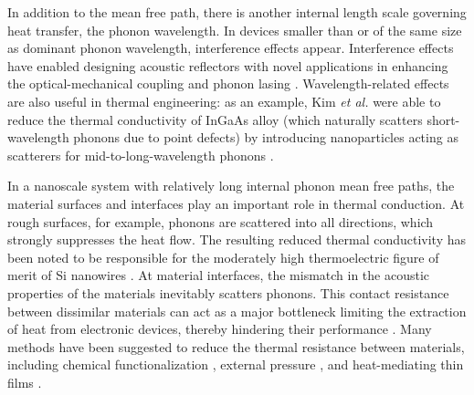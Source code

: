 In addition to the mean free path, there is another internal length scale governing heat transfer, the phonon wavelength. In devices smaller than or of the same size as dominant phonon wavelength, interference effects appear. Interference effects have enabled designing acoustic reflectors with novel applications in enhancing the optical-mechanical coupling \cite{fainstein13} and phonon lasing \cite{maryam13}. Wavelength-related effects are also useful in thermal engineering: as an example, Kim \textit{et al.} were able to reduce the thermal conductivity of InGaAs alloy (which naturally scatters short-wavelength phonons due to point defects) by introducing nanoparticles acting as scatterers for mid-to-long-wavelength phonons \cite{kim06}. %

In a nanoscale system with relatively long internal phonon mean free paths, the material surfaces and interfaces play an important role in thermal conduction. At rough surfaces, for example, phonons are scattered into all directions, which strongly suppresses the heat flow. The resulting reduced thermal conductivity has been noted to be responsible for the moderately high thermoelectric figure of merit of Si nanowires \cite{hochbaum08}. At material interfaces, the mismatch in the acoustic properties of the materials inevitably scatters phonons.  This contact resistance between dissimilar materials can act as a major bottleneck limiting the extraction of heat from electronic devices, thereby hindering their performance \cite{}. Many methods have been suggested to reduce the thermal resistance between materials, including chemical functionalization \cite{hopkins11,kaur14}, external pressure \cite{shen11,chalopin12}, and heat-mediating thin films \cite{}.







